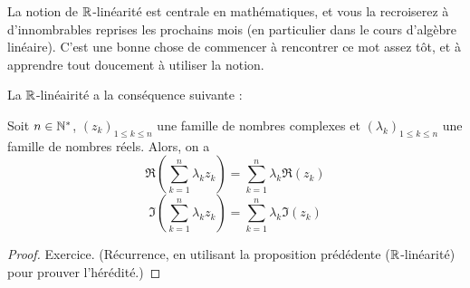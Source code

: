 \begin{mdframed}
La notion de $\mathbb{R}$-linéarité est centrale en mathématiques, et vous la recroiserez à d'innombrables reprises les prochains mois (en particulier dans le cours d'algèbre linéaire). C'est une bonne chose de commencer à rencontrer ce mot assez tôt, et à apprendre tout doucement à utiliser la notion.
\end{mdframed}

La $\mathbb{R}$-linéairité a la conséquence suivante :

\begin{corollaire}
Soit $n\in \mathbb{N}^*$, $(z_k)_{1\leq k \leq n}$ une famille de nombres complexes et $(\lambda_k)_{1\leq k \leq n}$ une famille de nombres réels. Alors, on a
\[ \Re\left(\sum_{k=1}^n \lambda_kz_k\right) = \sum_{k=1}^n \lambda_k\Re\left(z_k\right)\]
\[ \Im\left(\sum_{k=1}^n \lambda_kz_k\right) = \sum_{k=1}^n \lambda_k\Im\left(z_k\right)\]
\end{corollaire}
\begin{proof}
Exercice. (Récurrence, en utilisant la proposition prédédente ($\mathbb{R}$-linéarité) pour prouver l'hérédité.)
\end{proof}